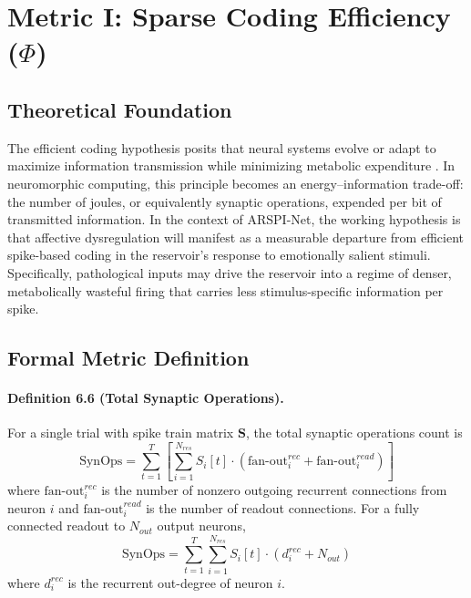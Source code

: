 \section{Metric I: Sparse Coding Efficiency ($\Phi$)}
\label{sec:dynamics_phi}

\subsection{Theoretical Foundation}

The efficient coding hypothesis posits that neural systems evolve or adapt to maximize information transmission while minimizing metabolic expenditure \cite{barlow_possible_1961,olshausen_emergence_1996}. In neuromorphic computing, this principle becomes an energy--information trade-off: the number of joules, or equivalently synaptic operations, expended per bit of transmitted information. In the context of ARSPI-Net, the working hypothesis is that affective dysregulation will manifest as a measurable departure from efficient spike-based coding in the reservoir's response to emotionally salient stimuli. Specifically, pathological inputs may drive the reservoir into a regime of denser, metabolically wasteful firing that carries less stimulus-specific information per spike.

\subsection{Formal Metric Definition}

\paragraph{Definition 6.6 (Total Synaptic Operations).}
For a single trial with spike train matrix $\mathbf{S}$, the total synaptic operations count is
\begin{equation}
\mathrm{SynOps} = \sum_{t=1}^{T} \left[ \sum_{i=1}^{N_{res}} S_i[t] \cdot \left(\mathrm{fan\mbox{-}out}^{rec}_i + \mathrm{fan\mbox{-}out}^{read}_i\right) \right]
\end{equation}
where $\mathrm{fan\mbox{-}out}^{rec}_i$ is the number of nonzero outgoing recurrent connections from neuron $i$ and $\mathrm{fan\mbox{-}out}^{read}_i$ is the number of readout connections. For a fully connected readout to $N_{out}$ output neurons,
\begin{equation}
\mathrm{SynOps} = \sum_{t=1}^{T} \sum_{i=1}^{N_{res}} S_i[t] \cdot (d_i^{rec}+N_{out})
\end{equation}
where $d_i^{rec}$ is the recurrent out-degree of neuron $i$.

